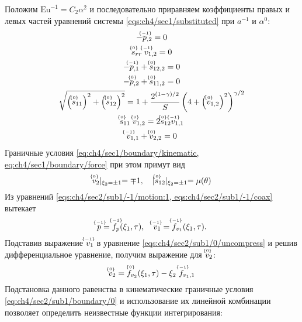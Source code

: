 Положим $\text{Eu}^{-1} = C_2 \alpha^2$ и последовательно приравняем коэффициенты правых и левых частей уравнений системы \cref{eqs:ch4/sec1/substituted} при $a^{-1}$ и $\alpha^0$:
\begin{subequations}
  \label{eqs:ch4/sec2/sub1/main}
  \begin{gather}
    \label{eqs:ch4/sec2/sub1/-1/motion:1}
    -\uindex{p}{-1}_{,2} = 0
    \\
    \label{eqs:ch4/sec2/sub1/-1/coax}
    \uindex{s}{0}_{rr} \; \uindex{v}{-1}_{1,2} = 0
    \\
    \label{eqs:ch4/sec2/sub1/0/motion:1}
    -\uindex{p}{-1}_{,1} + \uindex{s}{0}_{12,2} = 0
    \\
    \label{eqs:ch4/sec2/sub1/0/motion:2}
    -\uindex{p}{0}_{,2} + \uindex{s}{0}_{11,2} = 0
    \\
    \label{eqs:ch4/sec2/sub1/0/plasticity}
    \sqrt{\left(\uindex{s}{0}_{11}\right)^2 + \left(\uindex{s}{0}_{12}\right)^2} = 1 + \frac{2^{(1-\gamma)/2}}{S} \left(4+\left(\uindex{v}{0}_{1,2}\right)^2\right)^{\gamma/2}
    \\
    \label{eqs:ch4/sec2/sub1/0/coax}
    \uindex{s}{0}_{11} \; \uindex{v}{0}_{1,2} = 2 \uindex{s}{0}_{12} \uindex{v}{-1}_{1,1}
    \\
    \label{eqs:ch4/sec2/sub1/0/uncompress}
    \uindex{v}{-1}_{1,1} + \uindex{v}{0}_{2,2} = 0
  \end{gather}
\end{subequations}
Граничные условия \cref{eq:ch4/sec1/boundary/kinematic, eq:ch4/sec1/boundary/force} при этом примут вид
\begin{equation}
  \label{eq:ch4/sec2/sub1/boundary/0}
  \uindex{v}{0}_{2}\lvert_{\xi_2=\pm 1} = \mp 1, \quad \lvert \uindex{s}{0}_{12}\lvert_{\xi_2=\pm 1} = \mu(\theta)
\end{equation}
Из уравнений \cref{eqs:ch4/sec2/sub1/-1/motion:1, eqs:ch4/sec2/sub1/-1/coax} вытекает
\begin{equation*}
  \uindex{p}{-1} = \uindex{f}{-1}_{p}(\xi_1, \tau), \quad \uindex{v}{-1}_{1} = \uindex{f}{-1}_{v_{1}}(\xi_1, \tau).
\end{equation*}
Подставив выражение $\uindex{v}{-1}_{1}$ в уравнение \cref{eqs:ch4/sec2/sub1/0/uncompress} и решив дифференциальное уравнение, получим выражение для $\uindex{v}{0}_{2}$:
\begin{equation*}
  \uindex{v}{0}_{2} = \uindex{f}{0}_{v_{2}}(\xi_1, \tau) - \xi_2 \ \uindex{f}{-1}_{v_{1},1}
\end{equation*}
Подстановка данного равенства в кинематические граничные условия \cref{eq:ch4/sec2/sub1/boundary/0} и использование их линейной комбинации позволяет определить неизвестные функции интегрирования:

